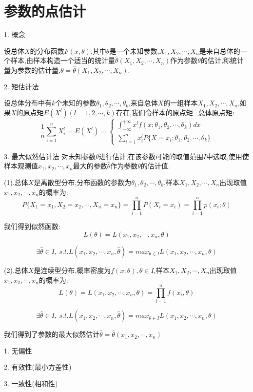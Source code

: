 \section{参数的点估计}
\begin{definition}[矩估计和最大似然估计]
	1. 概念
	
	设总体$X$的分布函数$F(x,\theta)$,其中$\theta$是一个未知参数,$X_{1},X_{2},\cdots,X_{n}$是来自总体的一个样本,由样本构造一个适当的统计量$\hat{\theta}(X_{1},X_{2},\cdots,X_{n})$作为参数$\theta$的估计,称统计量为参数的估计量,$\theta=\hat{\theta}(X_{1},X_{2},\cdots,X_{n})$.
	
	2. 矩估计法
	
	设总体分布中有$k$个未知的参数$\theta_{1},\theta_{2},\cdots,\theta_{k}$,来自总体$X$的一组样本$X_{1},X_{2},\cdots,X_{n}$,如果$X$的原点矩$E(X^{l})(l=1,2,\cdots,k)$存在,我们令样本的原点矩=总体原点矩: 
	$$\dfrac{1}{n}\sum\limits_{i=1}^{n}X_{i}^{l}=E(X^{l})=\left\lbrace 
	\begin{array}{l}
		\int_{-\infty}^{+\infty}x^{l}f(x;\theta_{1},\theta_{2},\cdots,\theta_{k})dx\\
		\sum\limits_{i=1}^{n}x_{i}^{l}P\{X=x_{i};\theta_{1},\theta_{2},\cdots,\theta_{k}\}
	\end{array}
	\right. $$
	
	3. 最大似然估计法
	对未知参数$\theta$进行估计,在该参数可能的取值范围$I$中选取,使用使样本观测值$x_{1},x_{2},\cdots,x_{n}$最大的参数$\hat{\theta}$作为参数$\theta$的估计值.
	
	(1).总体$X$是离散型分布,分布函数的参数为$\theta_{1},\theta_{2},\cdots,\theta_{k}$,样本$X_{1},X_{2},\cdots,X_{n}$出现取值$x_{1},x_{2},\cdots,x_{n}$的概率为: 
	$$P\{X_{1}=x_{1},X_{2}=x_{2},\cdots,X_{n}=x_{n}\}=\prod\limits_{i=1}^{n}P(X_{i}=x_{i})=\prod\limits_{i=1}^{n}p(x_{i};\theta)$$
	
	我们得到似然函数: 
	$$L(\theta)=L(x_{1},x_{2},\cdots,x_{n},\theta)$$
	
	$$\exists \hat{\theta}\in I,\ s.t. L(x_{1},x_{2},\cdots,x_{n},\hat{\theta})=max_{\theta\in I}L(x_{1},x_{2},\cdots,x_{n},\theta)$$
	
	(2).总体$X$是连续型分布,概率密度为$f(x;\theta),\theta\in I$,样本$X_{1},X_{2},\cdots,X_{n}$出现取值$x_{1},x_{2},\cdots,x_{n}$的概率为: 
	$$L(\theta)=L(x_{1},x_{2},\cdots,x_{n},\theta)=\prod\limits_{i=1}^{n}f(x_{i},\theta)$$
	
	$$\exists \hat{\theta}\in I,\ s.t. L(x_{1},x_{2},\cdots,x_{n},\hat{\theta})=max_{\theta\in I}L(x_{1},x_{2},\cdots,x_{n},\theta)$$
	
	我们得到了参数的最大似然估计$\hat{\theta}=\hat{\theta}(x_{1},x_{2},\cdots,x_{n})$
	\begin{anymark}[估计量的评判标准]
		1. 无偏性
		
		2. 有效性(最小方差性)
		
		3. 一致性(相和性)
	\end{anymark}
\end{definition}
